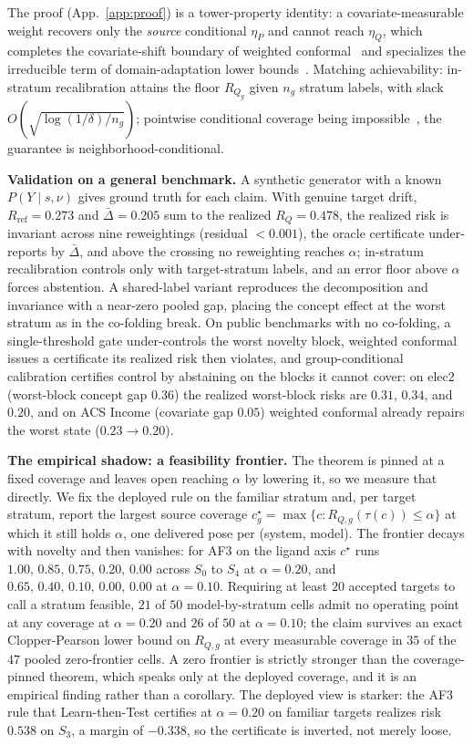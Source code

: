 \documentclass[10pt]{article}
\begin{document}
The proof (App.~\ref{app:proof}) is a tower-property identity: a covariate-measurable weight
recovers only the \emph{source} conditional $\eta_P$ and cannot reach $\eta_Q$, which completes the
covariate-shift boundary of weighted conformal~\citep{tibshirani2019} and specializes the
irreducible term of domain-adaptation lower bounds~\citep{bendavid2010}. Matching achievability:
in-stratum recalibration attains the floor $R_{Q_g}$ given $n_g$ stratum labels, with slack
$O(\sqrt{\log(1/\delta)/n_g})$; pointwise conditional coverage being
impossible~\citep{barber2021limits}, the guarantee is neighborhood-conditional.

\textbf{Validation on a general benchmark.} A synthetic generator with a known $P(Y\mid s,\nu)$
gives ground truth for each claim. With genuine target drift, $R_{\mathrm{ref}}=0.273$ and
$\bar\Delta=0.205$ sum to the realized $R_Q=0.478$, the realized risk is invariant across nine
reweightings (residual $<0.001$), the oracle certificate under-reports by $\bar\Delta$, and above
the crossing no reweighting reaches $\alpha$; in-stratum recalibration controls only with
target-stratum labels, and an error floor above $\alpha$ forces abstention. A shared-label variant
reproduces the decomposition and invariance with a near-zero pooled gap, placing the concept effect
at the worst stratum as in the co-folding break. On public benchmarks
with no co-folding, a single-threshold gate under-controls the worst novelty block, weighted
conformal issues a certificate its realized risk then violates, and group-conditional calibration
certifies control by abstaining on the blocks it cannot cover: on elec2 (worst-block concept gap
$0.36$) the realized worst-block risks are $0.31$, $0.34$, and $0.20$, and on ACS Income (covariate
gap $0.05$) weighted conformal already repairs the worst state ($0.23\to0.20$).

\textbf{The empirical shadow: a feasibility frontier.} The theorem is pinned at a fixed coverage and
leaves open reaching $\alpha$ by lowering it, so we measure that directly. We fix the deployed rule
on the familiar stratum and, per target stratum, report the largest source coverage
$c^\star_g=\max\{c:R_{Q,g}(\tau(c))\le\alpha\}$ at which it still holds $\alpha$, one delivered pose
per (system, model). The frontier decays with novelty and then vanishes: for AF3 on the ligand axis
$c^\star$ runs $1.00,\,0.85,\,0.75,\,0.20,\,0.00$ across $S_0$ to $S_4$ at $\alpha=0.20$, and
$0.65,\,0.40,\,0.10,\,0.00,\,0.00$ at $\alpha=0.10$. Requiring at least $20$ accepted targets to call
a stratum feasible, $21$ of $50$ model-by-stratum cells admit no operating point at any coverage at
$\alpha=0.20$ and $26$ of $50$ at $\alpha=0.10$; the claim survives an exact Clopper-Pearson lower
bound on $R_{Q,g}$ at every measurable coverage in $35$ of the $47$ pooled zero-frontier cells. A
zero frontier is strictly stronger than the coverage-pinned theorem, which speaks only at the
deployed coverage, and it is an empirical finding rather than a corollary. The deployed view is
starker: the AF3 rule that Learn-then-Test certifies at $\alpha=0.20$ on familiar targets realizes
risk $0.538$ on $S_3$, a margin of $-0.338$, so the certificate is inverted, not merely loose.
\end{document}
